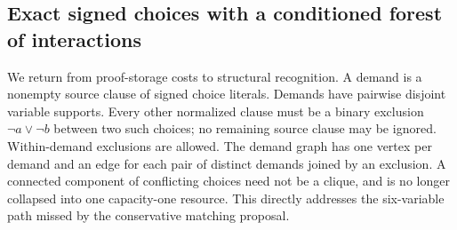 \subsection{Exact signed choices with a conditioned forest of interactions}
\label{sec:choice-forest}

We return from proof-storage costs to structural recognition. A demand is a
nonempty source clause of signed choice literals. Demands have pairwise disjoint
variable supports. Every other normalized clause must be a binary exclusion
$\neg a\vee\neg b$ between two such choices; no remaining source clause may be
ignored. Within-demand exclusions are allowed. The demand graph has one vertex
per demand and an edge for each pair of distinct demands joined by an exclusion.
A connected component of conflicting choices need not be a clique, and is no
longer collapsed into one capacity-one resource. This directly addresses the
six-variable path missed by the conservative matching proposal.

